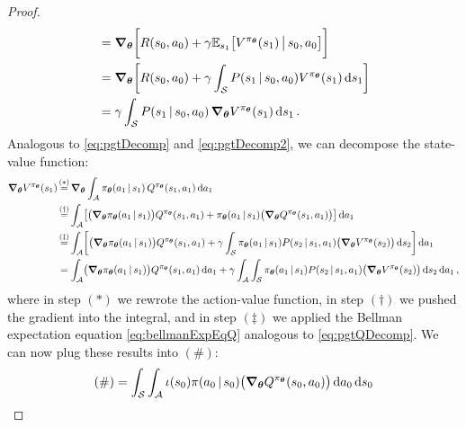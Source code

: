 \begin{proof}
\begin{align}
					&= \grad_{\bm{\theta}} \biggl[ R(s_0, a_0) + \gamma \mathbb{E}_{s_1}\bigl[ V^{\pi_{\bm{\theta}}}(s_1) \,\big\vert\, s_0, a_0 \bigr] \biggr] \\
					&= \grad_{\bm{\theta}} \biggl[ R(s_0, a_0) + \gamma \int_\mathcal{S} P(s_1 \,\vert\, s_0, a_0) V^{\pi_{\bm{\theta}}}(s_1) \dd{s_1} \biggr] \\
					&= \gamma \int_\mathcal{S} P(s_1 \,\vert\, s_0, a_0) \, \grad_{\bm{\theta}} V^{\pi_{\bm{\theta}}}(s_1) \dd{s_1}.
				\label{eq:pgtQDecomp}
			\end{align}
			Analogous to \eqref{eq:pgtDecomp} and \eqref{eq:pgtDecomp2}, we can decompose the state-value function:
			\begin{align}
				\grad_{\vec{\theta}} V^{\pi_{\vec{\theta}}}(s_1)
					&\overset{\mathclap{(\ast)}}{=} \grad_{\vec{\theta}} \int_\mathcal{A} \pi_{\vec{\theta}}(a_1 \given s_1) \, Q^{\pi_{\vec{\theta}}}(s_1, a_1) \dd{a_1} \\
					&\overset{\mathclap{(\dagger)}}{=} \int_\mathcal{A} \bigl[ \bigl( \grad_{\vec{\theta}} \pi_{\vec{\theta}}(a_1 \given s_1) \bigr) Q^{\pi_{\vec{\theta}}}(s_1, a_1) + \pi_{\vec{\theta}}(a_1 \given s_1) \bigl( \grad_{\vec{\theta}} Q^{\pi_{\vec{\theta}}}(s_1, a_1) \bigr) \bigr] \dd{a_1} \\
					&\overset{\mathclap{(\ddagger)}}{=} \int_\mathcal{A} \biggl[ \bigl( \grad_{\vec{\theta}} \pi_{\vec{\theta}}(a_1 \given s_1) \bigr) Q^{\pi_{\vec{\theta}}}(s_1, a_1) + \gamma \int_\mathcal{S} \pi_{\vec{\theta}}(a_1 \given s_1) P(s_2 \given s_1, a_1) \bigl( \grad_{\vec{\theta}} V^{\pi_{\vec{\theta}}}(s_2) \bigr) \dd{s_2} \biggr] \dd{a_1} \\
					&= \int_\mathcal{A} \bigl( \grad_{\vec{\theta}} \pi_{\vec{\theta}}(a_1 \given s_1) \bigr) Q^{\pi_{\vec{\theta}}}(s_1, a_1) \dd{a_1} + \gamma \int_\mathcal{A} \int_\mathcal{S} \pi_{\vec{\theta}}(a_1 \given s_1) P(s_2 \given s_1, a_1) \bigl( \grad_{\vec{\theta}} V^{\pi_{\vec{\theta}}}(s_2) \bigr) \dd{s_2} \dd{a_1},
			\end{align}
			where in step \((\ast)\) we rewrote the action-value function, in step \((\dagger)\) we pushed the gradient into the integral, and in step \((\ddagger)\) we applied the Bellman expectation equation \eqref{eq:bellmanExpEqQ} analogous to \eqref{eq:pgtQDecomp}. We can now plug these results into \((\#)\):
			\begin{align}
				(\#)
					&= \int_\mathcal{S} \int_\mathcal{A} \iota(s_0) \pi(a_0 \given s_0) \bigl( \grad_{\vec{\theta}} Q^{\pi_{\vec{\theta}}}(s_0, a_0) \bigr) \dd{a_0} \dd{s_0} \\

\end{align}
\end{proof}
